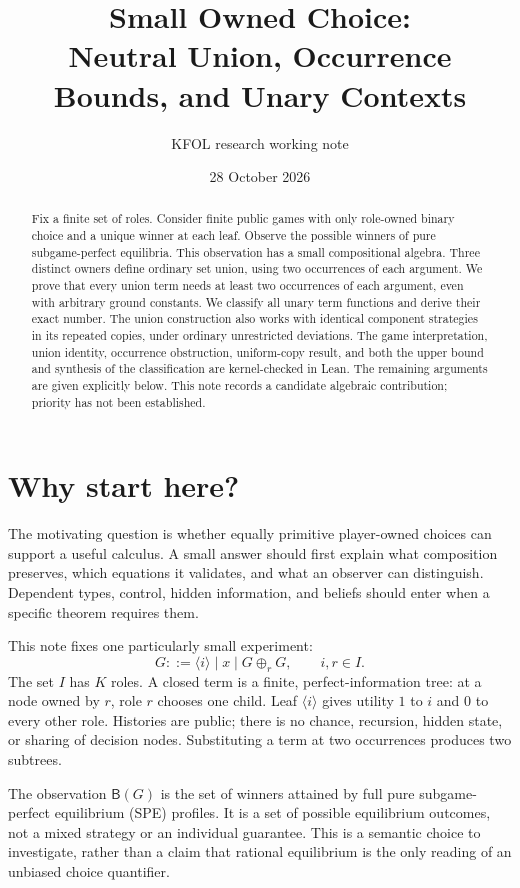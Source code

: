 \documentclass[11pt]{article}
\title{Small Owned Choice:\\Neutral Union, Occurrence Bounds, and Unary Contexts}
\author{KFOL research working note}
\date{28 October 2026}
\newcommand{\at}[1]{\langle #1\rangle}
\newcommand{\ch}[1]{\mathbin{\oplus_{#1}}}
\newcommand{\B}{\mathsf B}
\begin{document}
\maketitle
\begin{abstract}
Fix a finite set of roles. Consider finite public games with only
role-owned binary choice and a unique winner at each leaf. Observe the
possible winners of pure subgame-perfect equilibria. This observation has
a small compositional algebra. Three distinct owners define ordinary set
union, using two occurrences of each argument. We prove that every union
term needs at least two occurrences of each argument, even with arbitrary
ground constants. We classify all unary term functions and derive their
exact number. The union construction also works with identical component
strategies in its repeated copies, under ordinary unrestricted deviations.
The game interpretation, union identity, occurrence obstruction, uniform-copy
result, and both the upper bound and synthesis of the classification are
kernel-checked in Lean.
The remaining arguments are given explicitly below. This note records a
candidate algebraic contribution; priority has not been established.
\end{abstract}

\section{Why start here?}

The motivating question is whether equally primitive player-owned choices
can support a useful calculus. A small answer should first explain what
composition preserves, which equations it validates, and what an observer
can distinguish. Dependent types, control, hidden information, and beliefs
should enter when a specific theorem requires them.

This note fixes one particularly small experiment:
\[
  G ::= \at i \mid x \mid G\ch r G, \qquad i,r\in I.
\]
The set $I$ has $K$ roles. A closed term is a finite, perfect-information
tree: at a node owned by $r$, role $r$ chooses one child. Leaf $\at i$
gives utility $1$ to $i$ and $0$ to every other role. Histories are public;
there is no chance, recursion, hidden state, or sharing of decision nodes.
Substituting a term at two occurrences produces two subtrees.

The observation $\B(G)$ is the set of winners attained by full pure
subgame-perfect equilibrium (SPE) profiles. It is a set of possible
equilibrium outcomes, not a mixed strategy or an individual guarantee.
This is a semantic choice to investigate, rather than a claim that rational
equilibrium is the only reading of an unbiased choice quantifier.
\end{document}
